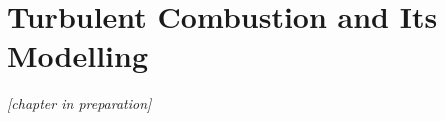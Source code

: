 \chapter{Turbulent Combustion and Its Modelling}\label{ch:turbcomb}

\emph{[chapter in preparation]}
